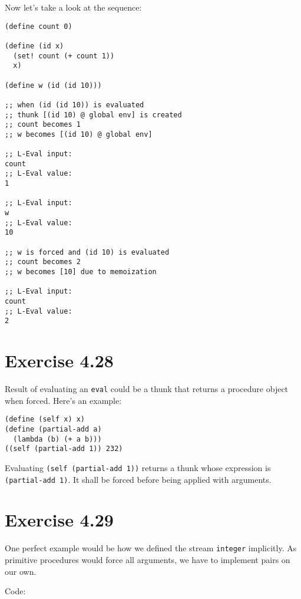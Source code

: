 \documentclass[../main.tex]{subfiles}
\begin{document}
Now let's take a look at the sequence:

\begin{lstlisting}
(define count 0)

(define (id x)
  (set! count (+ count 1))
  x)

(define w (id (id 10)))

;; when (id (id 10)) is evaluated
;; thunk [(id 10) @ global env] is created
;; count becomes 1
;; w becomes [(id 10) @ global env]

;; L-Eval input:
count
;; L-Eval value:
1

;; L-Eval input:
w
;; L-Eval value:
10

;; w is forced and (id 10) is evaluated
;; count becomes 2
;; w becomes [10] due to memoization

;; L-Eval input:
count
;; L-Eval value:
2
\end{lstlisting}

\section{Exercise 4.28}

Result of evaluating an \lstinline{eval} could be a thunk that returns a procedure object when forced. Here's an example:

\begin{lstlisting}
(define (self x) x)
(define (partial-add a)
  (lambda (b) (+ a b)))
((self (partial-add 1)) 232)
\end{lstlisting}

Evaluating \lstinline{(self (partial-add 1))} returns a thunk whose expression is \lstinline{(partial-add 1)}. It shall be forced before being applied with arguments.

\section{Exercise 4.29}

One perfect example would be how we defined the stream \lstinline{integer} implicitly. As primitive procedures would force all arguments, we have to implement pairs on our own.

Code:
\end{document}
